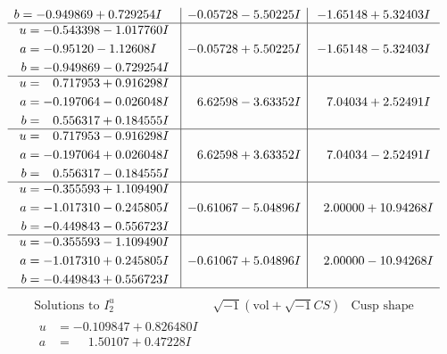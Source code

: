\documentclass[1p]{elsarticle_modified}
\theoremstyle{definition}
\newcommand{\I}{\sqrt{-1}}
\begin{document}
$$\begin{array}{c|c|c}
\begin{aligned}
b &= -0.949869 + 0.729254 I\end{aligned}
 & -0.05728 - 5.50225 I & -1.65148 + 5.32403 I \\ \hline\begin{aligned}
u &= -0.543398 - 1.017760 I \\
a &= -0.95120 - 1.12608 I \\
b &= -0.949869 - 0.729254 I\end{aligned}
 & -0.05728 + 5.50225 I & -1.65148 - 5.32403 I \\ \hline\begin{aligned}
u &= \phantom{-}0.717953 + 0.916298 I \\
a &= -0.197064 - 0.026048 I \\
b &= \phantom{-}0.556317 + 0.184555 I\end{aligned}
 & \phantom{-}6.62598 - 3.63352 I & \phantom{-}7.04034 + 2.52491 I \\ \hline\begin{aligned}
u &= \phantom{-}0.717953 - 0.916298 I \\
a &= -0.197064 + 0.026048 I \\
b &= \phantom{-}0.556317 - 0.184555 I\end{aligned}
 & \phantom{-}6.62598 + 3.63352 I & \phantom{-}7.04034 - 2.52491 I \\ \hline\begin{aligned}
u &= -0.355593 + 1.109490 I \\
a &= -1.017310 - 0.245805 I \\
b &= -0.449843 - 0.556723 I\end{aligned}
 & -0.61067 - 5.04896 I & \phantom{-}2.00000 + 10.94268 I \\ \hline\begin{aligned}
u &= -0.355593 - 1.109490 I \\
a &= -1.017310 + 0.245805 I \\
b &= -0.449843 + 0.556723 I\end{aligned}
 & -0.61067 + 5.04896 I & \phantom{-}2.00000 - 10.94268 I\\
 \hline 
 \end{array}$$\newpage$$\begin{array}{c|c|c}  
\text{Solutions to }I^u_{2}& \I (\text{vol} + \sqrt{-1}CS) & \text{Cusp shape}\\
 \hline 
\begin{aligned}
u &= -0.109847 + 0.826480 I \\
a &= \phantom{-}1.50107 + 0.47228 I \\

\end{aligned}
\end{array}$$
\end{document}
